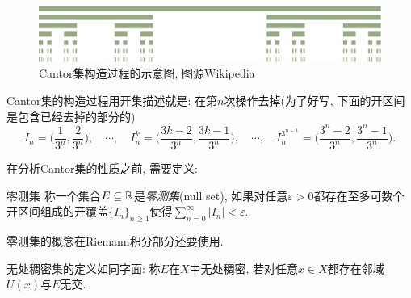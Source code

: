\begin{figure}[H]
	\centering
	\includegraphics[width=16cm]{./attachment/cantor_set.pdf}
	\caption{Cantor集构造过程的示意图, 图源Wikipedia}
\end{figure}

Cantor集的构造过程用开集描述就是: 在第$n$次操作去掉(为了好写, 下面的开区间是包含已经去掉的部分的)$$I_n^1 = \big( \frac{1}{3^n},\frac{2}{3^n} \big), \quad  \cdots ,\quad I_n^k = \big( \frac{3k-2}{3^n},\frac{3k-1}{3^n} \big),\quad  \cdots , \quad I_n^{3^{n-1}} = \big( \frac{3^n-2}{3^n},\frac{3^n-1}{3^n} \big). $$

在分析Cantor集的性质之前, 需要定义: 

\begin{definition}{零测集}
	称一个集合$E \subseteq \mathbb{R}$是\textit{零测集}(null set), 如果对任意$\varepsilon >0$都存在至多可数个开区间组成的开覆盖$\{ I_n \}_{n \geq 1}$使得$\sum_{n=0}^{\infty} |I_n|<\varepsilon$. 
\end{definition}
\begin{remark}
	零测集的概念在Riemann积分部分还要使用. 
\end{remark}

无处稠密集的定义如同字面: 称$E$在$X$中无处稠密, 若对任意$x \in X$都存在邻域$U(x)$与$E$无交. 

